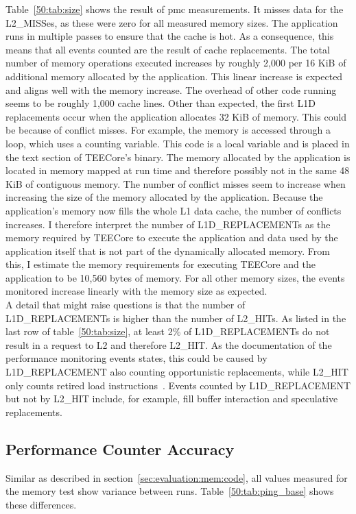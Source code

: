 Table~\ref{50:tab:size} shows the result of \gls{pmc} measurements. It misses
data for the L2\_MISSes, as these were zero for all measured memory sizes. The
application runs in multiple passes to ensure that the cache is hot. As a
consequence, this means that all events counted are the result of cache
replacements. The total number of memory operations executed increases by
roughly 2,000 per 16 KiB of additional memory allocated by the application. This
linear increase is expected and aligns well with the memory increase. The
overhead of other code running seems to be roughly 1,000 cache lines. Other than
expected, the first L1D replacements occur when the application allocates 32 KiB
of memory. This could be because of conflict misses. For example, the memory is
accessed through a loop, which uses a counting variable. This code is a local
variable and is placed in the text section of TEECore's binary. The memory
allocated by the application is located in memory mapped at run time and
therefore possibly not in the same 48 KiB of contiguous memory. The number of
conflict misses seem to increase when increasing the size of the memory
allocated by the application. Because the application's memory now fills the
whole L1 data cache, the number of conflicts increases. I therefore interpret
the number of L1D\_REPLACEMENTs as the memory required by TEECore to execute the
application and data used by the application itself that is not part of the
dynamically allocated memory. From this, I estimate the memory requirements for
executing TEECore and the application to be 10,560 bytes of memory. For all
other memory sizes, the events monitored increase linearly with the memory size
as expected.\\

A detail that might raise questions is that the number of L1D\_REPLACEMENTs is
higher than the number of L2\_HITs. As listed in the last row of
table~\ref{50:tab:size}, at least 2\% of L1D\_REPLACEMENTs do not result in a
request to L2 and therefore L2\_HIT. As the documentation of the performance
monitoring events states, this could be caused by L1D\_REPLACEMENT also counting
opportunistic replacements, while L2\_HIT only counts retired load
instructions~\cite{perfmon}. Events counted by L1D\_REPLACEMENT but not by
L2\_HIT include, for example, fill buffer interaction and speculative
replacements.

\FloatBarrier

\subsection{Performance Counter Accuracy}
\label{eval:mem_constraints:accu}
Similar as described in section~\ref{sec:evaluation:mem:code}, all values
measured for the memory test show variance between runs.
Table~\ref{50:tab:ping_base} shows these differences.

